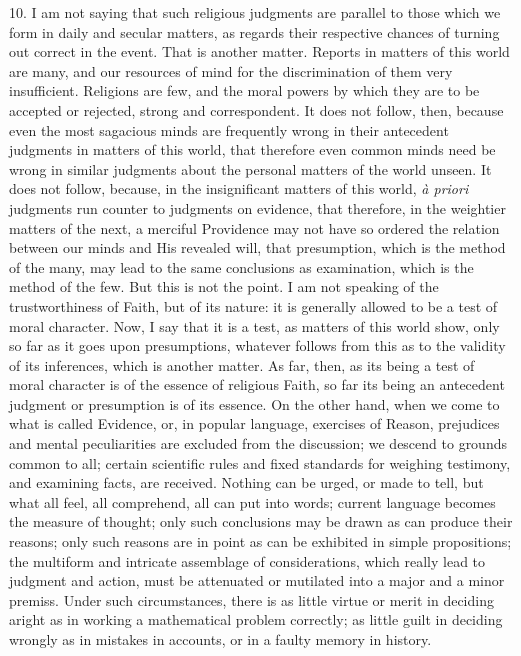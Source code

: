 10. I am not saying that such religious judgments are parallel to
those which we form in daily and secular matters, as regards their
respective chances of turning out correct in the event. That is
another matter. Reports in matters of this world are many, and our
resources of mind for the discrimination of them very insufficient.
Religions are few, and the moral powers by which they are to be
accepted or rejected, strong and correspondent. It does not follow,
then, because even the most sagacious minds are frequently wrong in
their antecedent judgments in matters of this world, that therefore
even common minds need be wrong in similar judgments about the
personal matters of the world unseen. It does not follow, because, in
the insignificant matters of this world, \emph{à priori} judgments
run counter to judgments on evidence, that therefore, in the weightier
matters of the next, a merciful Providence may not have so ordered the
relation between our minds and His revealed will, that presumption,
which is the method of the many, may lead to the same conclusions as
examination, which is the method of the few. But this is not the
point. I am not speaking of the trustworthiness of Faith, but of its
nature: it is generally allowed to be a test of moral character. Now,
I say that it is a test, as matters of this world show, only so far as
it goes upon presumptions, whatever follows from this as to the
validity of its inferences, which is another matter. As far, then, as
its being a test of moral character is of the essence of religious
Faith, so far its being an antecedent judgment or presumption is of
its essence. On the other hand, when we come to what is called
Evidence, or, in popular language, exercises of Reason, prejudices and
mental peculiarities are excluded from the discussion; we descend to
grounds common to all; certain scientific rules and fixed standards
for weighing testimony, and examining facts, are received. Nothing can
be urged, or made to tell, but what all feel, all comprehend, all
can
put into words; current language becomes the measure of thought; only
such conclusions may be drawn as can produce their reasons; only such
reasons are in point as can be exhibited in simple propositions; the
multiform and intricate assemblage of considerations, which really
lead to judgment and action, must be attenuated or mutilated into a
major and a minor premiss. Under such circumstances, there is as
little virtue or merit in deciding aright as in working a mathematical
problem correctly; as little guilt in deciding wrongly as in mistakes
in accounts, or in a faulty memory in history.

